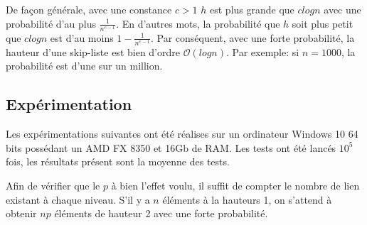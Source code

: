 \documentclass[hidelinks,a4paper, 12pt]{article}
\begin{document}
	 De façon générale, avec une constance $c>1$ $h$ est plus grande que $c log n$ avec une probabilité d'au plus $\frac{1}{n^{c-1}}$. En d'autres mots, la probabilité que $h$ soit plus petit que $c log n$ est d'au moins $1-\frac{1}{n^{c-1}}$. Par conséquent, avec une forte probabilité, la hauteur d'une skip-liste est bien d'ordre $\mathcal{O}(log n)$. Par exemple: si $n=1000$, la probabilité est d'une sur un million.
	
	
	\subsection{Expérimentation}
	
	Les expérimentations suivantes ont été réalises sur un ordinateur Windows 10 64 bits possédant un AMD FX 8350 et 16Gb de RAM. Les tests ont été lancés $10^5$ fois, les résultats présent sont la moyenne des tests.
	\newline
	
	Afin de vérifier que le $p$ à bien l'effet voulu, il suffit de compter le nombre de lien existant à chaque niveau. S'il y a $n$ éléments à la hauteurs 1, on s'attend à obtenir $np$ éléments de hauteur 2 avec une forte probabilité.
\end{document}
